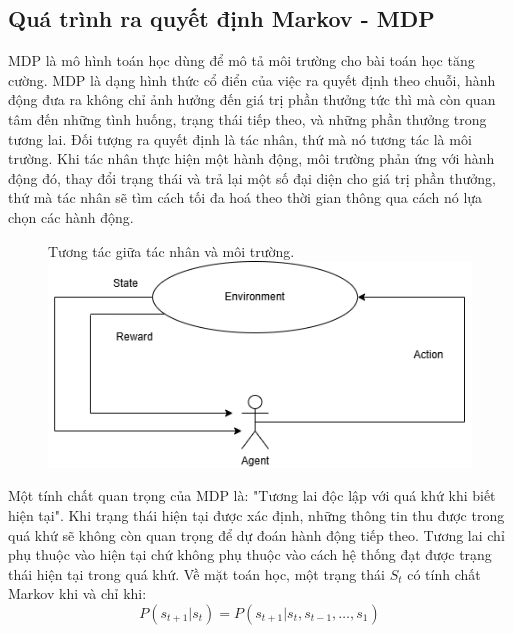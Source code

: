 \documentclass{uetgraduation}
\begin{document}
\subsection{Quá trình ra quyết định Markov - MDP}
MDP là mô hình toán học dùng để mô tả môi trường cho bài toán học tăng cường. MDP là dạng hình thức cổ điển của việc ra quyết định theo chuỗi, hành động đưa ra không chỉ ảnh hưởng đến giá trị phần thưởng
tức thì mà còn quan tâm đến những tình huống, trạng thái tiếp theo, và những phần thưởng trong tương lai. Đối tượng ra quyết định là tác nhân, thứ mà nó tương tác là môi trường. Khi tác nhân thực hiện một
hành động, môi trường phản ứng với hành động đó, thay đổi trạng thái và trả lại một số đại diện cho giá trị phần thưởng, thứ mà tác nhân sẽ tìm cách tối đa hoá theo thời gian thông qua cách nó lựa chọn các
hành động.
\begin{figure}{Tương tác giữa tác nhân và môi trường.}
    \centering
    \includegraphics[scale=0.7]{mdp}
    \label{fig:mdp}
\end{figure}

Một tính chất quan trọng của MDP là: "Tương lai độc lập với quá khứ khi biết hiện tại". Khi trạng thái hiện tại được xác định, những thông tin thu được trong quá khứ sẽ không còn quan trọng để
dự đoán hành động tiếp theo. Tương lai chỉ phụ thuộc vào hiện tại chứ không phụ thuộc vào cách hệ thống đạt được trạng thái hiện tại trong quá khứ.
Về mặt toán học, một trạng thái $S_t$ có tính chất Markov khi và chỉ khi:
\begin{equation}
    P(s_{t+1} | s_t) = P(s_{t+1} | s_t, s_{t-1},\dots, s_1)
\end{equation}
\end{document}
